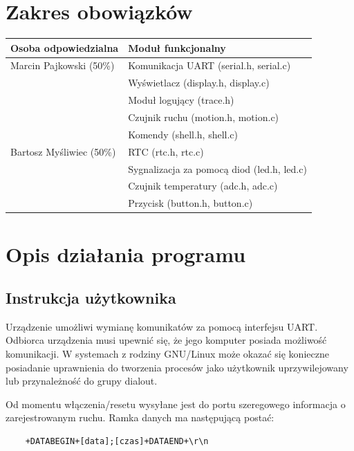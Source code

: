 \documentclass{article}
\begin{document}
\newpage
\section{Zakres obowiązków}

\begin{tabular}{|l|l|}
    \hline
    Osoba odpowiedzialna & Moduł funkcjonalny\\
    \hline
    Marcin Pajkowski (50\%)
    & Komunikacja UART (serial.h, serial.c)\\
    & Wyświetlacz (display.h, display.c)\\
    & Moduł logujący (trace.h)\\
    & Czujnik ruchu (motion.h, motion.c)\\
    & Komendy (shell.h, shell.c)\\
    \hline
    Bartosz Myśliwiec (50\%)
    & RTC (rtc.h, rtc.c)\\
    & Sygnalizacja za pomocą diod (led.h, led.c)\\
    & Czujnik temperatury (adc.h, adc.c)\\
    & Przycisk (button.h, button.c)\\
    \hline
\end{tabular}


\section{Opis działania programu}
\subsection{Instrukcja użytkownika}

Urządzenie umożliwi wymianę komunikatów za pomocą interfejsu UART. Odbiorca urządzenia
musi upewnić się, że jego komputer posiada możliwość komunikacji. W systemach
z rodziny GNU/Linux może okazać się konieczne posiadanie uprawnienia do tworzenia
procesów jako użytkownik uprzywilejowany lub przynależność do grupy dialout.

Od momentu włączenia/resetu wysyłane jest do portu szeregowego informacja o zarejestrowanym
ruchu. Ramka danych ma następującą postać:

\begin{lstlisting}
    +DATABEGIN+[data];[czas]+DATAEND+\r\n
\end{lstlisting}
\end{document}
